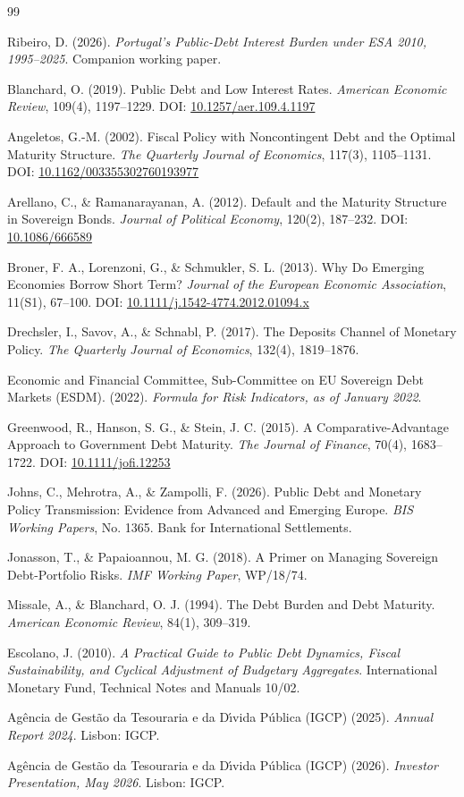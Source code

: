 \documentclass[11pt,a4paper]{article}
\providecommand{\doi}[1]{DOI: \href{https://doi.org/#1}{#1}}
\begin{document}
\begin{thebibliography}{99}
\sloppy

Ribeiro, D. (2026). \emph{Portugal's Public-Debt Interest Burden under ESA
2010, 1995--2025}. Companion working paper.

Blanchard, O. (2019). Public Debt and Low Interest Rates. \emph{American
Economic Review}, 109(4), 1197--1229. \doi{10.1257/aer.109.4.1197}

Angeletos, G.-M. (2002). Fiscal Policy with Noncontingent Debt and the
Optimal Maturity Structure. \emph{The Quarterly Journal of Economics},
117(3), 1105--1131. \doi{10.1162/003355302760193977}

Arellano, C., \& Ramanarayanan, A. (2012). Default and the Maturity Structure
in Sovereign Bonds. \emph{Journal of Political Economy}, 120(2), 187--232.
\doi{10.1086/666589}

Broner, F. A., Lorenzoni, G., \& Schmukler, S. L. (2013). Why Do Emerging
Economies Borrow Short Term? \emph{Journal of the European Economic
Association}, 11(S1), 67--100. \doi{10.1111/j.1542-4774.2012.01094.x}

Drechsler, I., Savov, A., \& Schnabl, P. (2017). The Deposits Channel of
Monetary Policy. \emph{The Quarterly Journal of Economics}, 132(4),
1819--1876.

Economic and Financial Committee, Sub-Committee on EU Sovereign Debt Markets
(ESDM). (2022). \emph{Formula for Risk Indicators, as of January 2022}.

Greenwood, R., Hanson, S. G., \& Stein, J. C. (2015). A Comparative-Advantage
Approach to Government Debt Maturity. \emph{The Journal of Finance}, 70(4),
1683--1722. \doi{10.1111/jofi.12253}

Johns, C., Mehrotra, A., \& Zampolli, F. (2026). Public Debt and Monetary
Policy Transmission: Evidence from Advanced and Emerging Europe. \emph{BIS
Working Papers}, No. 1365. Bank for International Settlements.

Jonasson, T., \& Papaioannou, M. G. (2018). A Primer on Managing Sovereign
Debt-Portfolio Risks. \emph{IMF Working Paper}, WP/18/74.

Missale, A., \& Blanchard, O. J. (1994). The Debt Burden and Debt Maturity.
\emph{American Economic Review}, 84(1), 309--319.

Escolano, J. (2010). \emph{A Practical Guide to Public Debt Dynamics, Fiscal
Sustainability, and Cyclical Adjustment of Budgetary Aggregates}. International
Monetary Fund, Technical Notes and Manuals 10/02.

Ag\^{e}ncia de Gest\~{a}o da Tesouraria e da D\'{\i}vida P\'{u}blica (IGCP)
(2025). \emph{Annual Report 2024}. Lisbon: IGCP.

Ag\^{e}ncia de Gest\~{a}o da Tesouraria e da D\'{\i}vida P\'{u}blica (IGCP)
(2026). \emph{Investor Presentation, May 2026}. Lisbon: IGCP.

\end{thebibliography}
\end{document}
